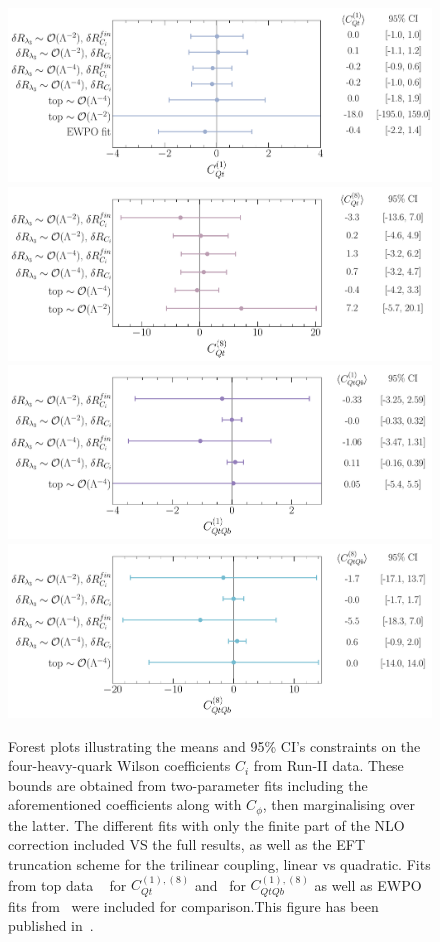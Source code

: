 \begin{figure}[htpb!]
	\vspace*{-0.5cm}
	\begin{center}
		\includegraphics[width=0.75\linewidth]{fig/uebeblick_Cqt1}
		\includegraphics[width=0.75\linewidth]{fig/uebeblick_Cqt8} 
		\includegraphics[width=0.75\linewidth]{fig/uebeblick_Cqtqb1}
		\includegraphics[width=0.75\linewidth]{fig/uebeblick_Cqtqb8}
	\end{center}
	\vspace*{-0.5cm}
	\caption{Forest plots illustrating the means and 95\% CI's constraints on the four-heavy-quark Wilson coefficients $C_i$ from Run-II data. These bounds are obtained from two-parameter fits including the aforementioned coefficients along with $C_\phi$, then marginalising over the latter. The different fits with only the finite part of the NLO correction included VS the full results, as well as the EFT truncation scheme for the trilinear coupling, linear vs quadratic. Fits from top data ~\cite{Ethier:2021bye} for $C_{Qt}^{(1),(8)}$ and~\cite{Hartland:2019bjb} for $C_{QtQb}^{(1),(8)}$ as well as EWPO fits from~\cite{Dawson:2022bxd} were included for comparison.This figure has been published in~\cite{Alasfar:2022zyr}.}
		\label{fig:summ4f}
\end{figure}
